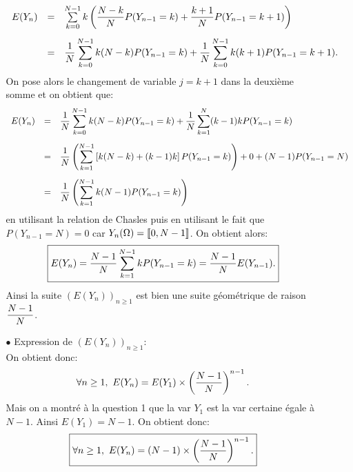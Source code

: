 \documentclass[a4paper, 11pt,reqno]{article}
\begin{document}
\begin{correction}
\begin{enumerate}
\begin{itemize}
				      $$\begin{array}{lll}
						      E(Y_n) & = & \sum\limits_{k=0}^{N-1} k\left(\ddp\frac{N-k}{N}P(Y_{n-1}=k)+\ddp\frac{k+1}{N}P(Y_{n-1}=k+1) \right)\vsec                   \\
						             & = & \ddp\frac{1}{N} \sum\limits_{k=0}^{N-1} k(N-k) P(Y_{n-1}=k) + \ddp\frac{1}{N} \sum\limits_{k=0}^{N-1} k(k+1)P(Y_{n-1}=k+1).
					      \end{array}$$
				      On pose alors le changement de variable $j=k+1$ dans la deuxi\`{e}me somme et on obtient que:
				      $$\begin{array}{lll}
						      E(Y_n) & = & \ddp\frac{1}{N} \sum\limits_{k=0}^{N-1} k(N-k) P(Y_{n-1}=k) + \ddp\frac{1}{N} \sum\limits_{k=1}^{N} (k-1)kP(Y_{n-1}=k)\vsec          \\
						             & = & \ddp\frac{1}{N} \left(\sum\limits_{k=1}^{N-1} \left\lbrack k(N-k)+(k-1)k \right\rbrack P(Y_{n-1}=k) \right)+0+(N-1)P(Y_{n-1}=N)\vsec \\
						             & = & \ddp\frac{1}{N} \left(\sum\limits_{k=1}^{N-1} k(N-1) P(Y_{n-1}=k) \right)
					      \end{array}$$
				      en utilisant la relation de Chasles puis en utilisant le fait que $P(Y_{n-1}=N)=0$ car $Y_n(\Omega)=\llbracket  0,N-1\rrbracket$. On obtient alors:
				      $$\fbox{$E(Y_n)=\displaystyle\frac{N-1}{N} \sum\limits_{k=1}^{N-1} k P(Y_{n-1}=k) =\displaystyle\frac{N-1}{N} E(Y_{n-1}).$}$$
				      Ainsi la suite $(E(Y_n))_{n\geq 1}$ est bien une suite g\'eom\'etrique de raison $\displaystyle\frac{N-1}{N}$.
			      \item[$\bullet$] Expression de $(E(Y_n))_{n\geq 1}$:\\
				      \noindent On obtient donc:
				      $$\forall n\geq 1,\ E(Y_n)=E(Y_1)\times \left( \ddp\frac{N-1}{N} \right)^{n-1}.$$
				      Mais on a montr\'e \`{a} la question 1 que la var $Y_1$ est la var certaine \'egale \`{a} $N-1$. Ainsi $E(Y_1)=N-1$. On obtient donc:
				      $$\fbox{$\forall n\geq 1,\ E(Y_n)=(N-1)\times \left( \ddp\frac{N-1}{N} \right)^{n-1}.$}$$
		      \end{itemize}
	\end{enumerate}
\end{correction}
\end{document}
